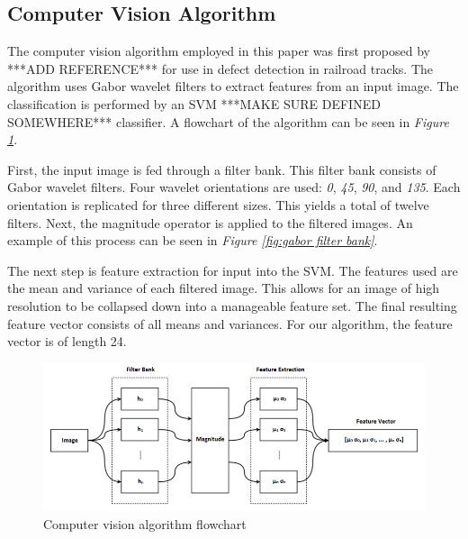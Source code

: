 \documentclass[letterpaper, 10 pt, conference]{ieeeconf}  %
\begin{document}
\subsection{Computer Vision Algorithm}

The computer vision algorithm employed in this paper was first proposed by ***ADD REFERENCE*** for use in defect detection in railroad tracks. The algorithm uses Gabor wavelet filters to extract features from an input image. The classification is performed by an SVM ***MAKE SURE DEFINED SOMEWHERE*** classifier. A flowchart of the algorithm can be seen in \textit{Figure \ref{fig:vision algorithm diagram}}.

First, the input image is fed through a filter bank. This filter bank consists of Gabor wavelet filters. Four wavelet orientations are used: \textit{0\degree}, \textit{45\degree}, \textit{90\degree}, and \textit{135\degree}. Each orientation is replicated for three different sizes. This yields a total of twelve filters. Next, the magnitude operator is applied to the filtered images. An example of this process can be seen in \textit{Figure \ref{fig:gabor filter bank}}.

The next step is feature extraction for input into the SVM. The features used are the mean and variance of each filtered image. This allows for an image of high resolution to be collapsed down into a manageable feature set. The final resulting feature vector consists of all means and variances. For our algorithm, the feature vector is of length 24.

\begin{figure}
    \centering
    \includegraphics[width=.75\textwidth]{computer_vision_diagram.png}
    \caption{Computer vision algorithm flowchart}
    \vspace*{2mm}
    \label{fig:vision algorithm diagram}
\end{figure}
\end{document}
